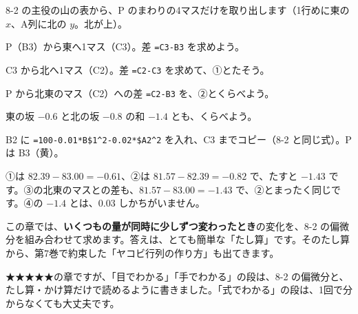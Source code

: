 \begin{yattemiyou}
8-2 の主役の山の表から、P のまわりの4マスだけを取り出します（1行めに東の $x$、A列に北の $y$。北が上）。\par\vspace{2pt}
\noindent\begin{minipage}[c]{0.54\linewidth}\raggedright
\begin{enumerate}[label={\bkcircled[bkGreen]{\arabic*}}, leftmargin=2.0\zw, itemsep=1pt, topsep=0pt]
\item P（B3）から東へ1マス（C3）。差 \texttt{=C3-B3} を求めよう。
\item C3 から北へ1マス（C2）。差 \texttt{=C2-C3} を求めて、①とたそう。
\item P から北東のマス（C2）への差 \texttt{=C2-B3} を、②とくらべよう。
\item 東の坂 $-0.6$ と北の坂 $-0.8$ の和 $-1.4$ とも、くらべよう。
\end{enumerate}
\end{minipage}\hfill
\begin{minipage}[c]{0.44\linewidth}\centering
{}\par\vspace{1mm}
{\footnotesize B2 に \texttt{=100-0.01*B\$1\^{}2-0.02*\$A2\^{}2} を入れ、C3 までコピー（8-2 と同じ式）。P は B3（黄）。}
\end{minipage}
\end{yattemiyou}

\noindent ①は $82.39-83.00=-0.61$、②は $81.57-82.39=-0.82$ で、たすと $-1.43$ です。③の北東のマスとの差も、$81.57-83.00=-1.43$ で、②とまったく同じです。④の $-1.4$ とは、0.03 しかちがいません。

この章では、\textbf{いくつもの量が同時に少しずつ変わったとき}の変化を、8-2 の偏微分を組み合わせて求めます。答えは、とても簡単な「たし算」です。そのたし算から、第7巻で約束した「ヤコビ行列の作り方」も出てきます。

★★★★★の章ですが、「目でわかる」「手でわかる」の段は、8-2 の偏微分と、たし算・かけ算だけで読めるように書きました。「式でわかる」の段は、1回で分からなくても大丈夫です。


